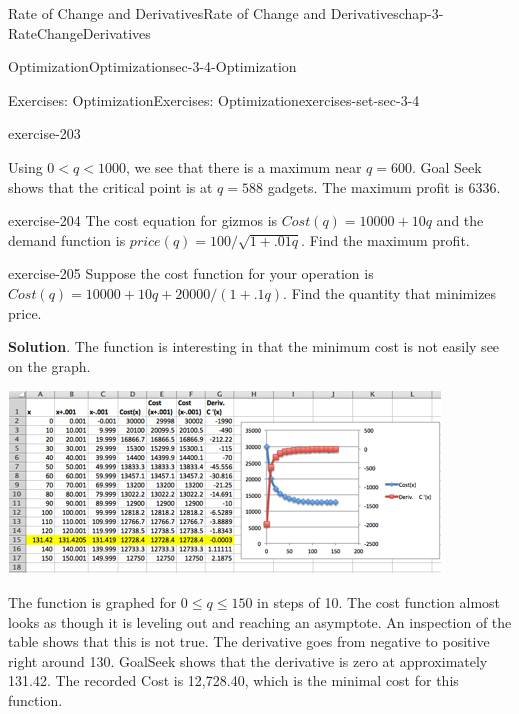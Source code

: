 \documentclass[oneside,10pt,]{book}
\numberwithin{equation}{section}
\newcommand{\lt}{<}
\begin{document}
\begin{chapterptx}{Rate of Change and Derivatives}{}{Rate of Change and Derivatives}{}{}{chap-3-RateChangeDerivatives}
\begin{sectionptx}{Optimization}{}{Optimization}{}{}{sec-3-4-Optimization}
\begin{exercises-subsection-numberless}{Exercises: Optimization}{}{Exercises: Optimization}{}{}{exercises-set-sec-3-4}
\begin{divisionexercise}{13}{}{}{exercise-203}
\begin{sidebyside}{1}{0.1}{0.1}{0}
\begin{sbspanel}{0.8}
\end{sbspanel}%
\end{sidebyside}%
\par
\hypertarget{p-1309}{}%
Using \(0\lt q\lt 1000\), we see that there is a maximum near \(q = 600\). Goal Seek shows that the critical point is at \(q = 588\) gadgets. The maximum profit is \textdollar{}6336.%
\end{divisionexercise}%
\begin{divisionexercise}{14}{}{}{exercise-204}%
\hypertarget{p-1310}{}%
The cost equation for gizmos is \(Cost(q)=10000+10q\) and the demand function is \(price(q)=100/\sqrt{1+.01q}\).  Find the maximum profit.%
\end{divisionexercise}%
\begin{divisionexercise}{15}{}{}{exercise-205}%
\hypertarget{p-1311}{}%
Suppose the cost function for your operation is \(Cost(q)=10000+10q+20000/(1+.1q)\). Find the quantity that minimizes price.%
\par\smallskip%
\noindent\textbf{Solution}.\hypertarget{solution-102}{}\quad%
\hypertarget{p-1312}{}%
The function is interesting in that the minimum cost is not easily see on the graph.%
\begin{sidebyside}{1}{0.1}{0.1}{0}%
\begin{sbspanel}{0.8}%
\includegraphics[width=1\linewidth]{images/sec3-4-sol15a.png}
\end{sbspanel}%
\end{sidebyside}%
\par
\hypertarget{p-1313}{}%
The function is graphed for \(0\le q\le 150\) in steps of 10. The cost function almost looks as though it is leveling out and reaching an asymptote. An inspection of the table shows that this is not true. The derivative goes from negative to positive right around 130. GoalSeek shows that the derivative is zero at approximately 131.42. The recorded Cost is \textdollar{}12,728.40, which is the minimal cost for this function.%
\end{divisionexercise}%

\end{exercises-subsection-numberless}
\end{sectionptx}
\end{chapterptx}
\end{document}
